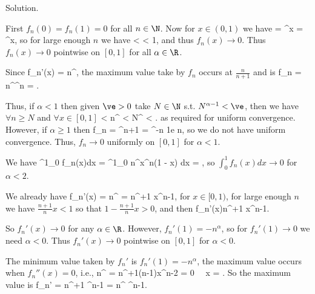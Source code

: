 Solution. \ben
\item [(i)] First $f_n(0)=f_n(1)=0$ for all $n\in\N$. Now for $x\in (0,1)$ we have
\be
{} = ^\alpha x = ^\alpha x,
\ee
so for large enough $n$ we have 
\be
{} <  < 1,
\ee
and thus $f_n(x)\to 0$. Thus $f_n(x) \to 0$ pointwise on $[0,1]$ for all $\alpha \in \R$.

\item [(ii)] Since 
\be
f_n'(x) = n^\alpha {},
\ee
the maximum value take by $f_n$ occurs at $\frac n{n+1}$ and is 
\be
f_n = n^\alpha {}^n = .
\ee

Thus, if $\alpha <1$ then given $\ve >0$ take $N\in \N$ s.t. $N^{\alpha -1} < \ve$, then we have $\forall n\geq N$ and $\forall x\in [0,1]$
\be
{} \leq {} < n^{} < N^{} < \ve.
\ee
as required for uniform convergence. However, if $\alpha \geq 1$ then
\be
f_n =  \geq {}^{n+1} = ^{-n} \cdot {} \to \frac 1e \quad{}n\to \infty,
\ee
so we do not have uniform convergence. Thus, $f_n \to 0$ uniformly on $[0,1]$ for $\alpha < 1$.

\item [(iii)] We have
\be
\int^1_0 f_n(x)dx = \int^1_0 n^\alpha x^n(1 - x) dx = ,
\ee
so $\int^1_0 f_n(x)dx\to 0$ for $\alpha < 2$.

\item [(iv)] We already have
\be
f_n'(x) = n^\alpha {} = n^{\alpha+1} x^{n-1},
\ee
for $x \in [0,1)$, for large enough $n$ we have $\frac{n+1}n x <1$ so that $1-\frac {n+1}nx >0$, and then
\leq f_n'(x)\leq n^{\alpha+1} x^{n-1}.
\ee

So $f_n'(x) \to 0$ for any $\alpha\in \R$. However, $f_n'(1) = -n^{\alpha}$, so for $f_n'(1) \to 0$ we need $\alpha <0$. Thus $f_n'(x)\to 0$ pointwise on $[0,1]$ for $\alpha <0$.


\item [(v)] The minimum value taken by $f_n'$ is $f_n'(1)=-n^\alpha$, the maximum value occurs when $f_n''(x) = 0$, i.e., 
\be
n^\alpha {} = n^{\alpha+1}(n-1)x^{n-2} = 0 \ \ra \ x = .
\ee
So the maximum value is 
\be
f_n' = n^{\alpha+1} ^{n-1} = n^{\alpha} ^{n-1}.
\ee

